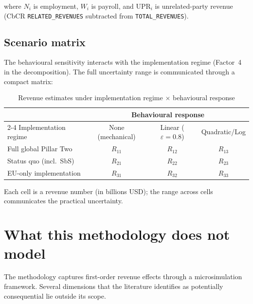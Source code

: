 \documentclass[11pt,a4paper]{article}
\newcommand{\code}[1]{\texttt{#1}}
\begin{document}
where $N_i$ is employment, $W_i$ is payroll, and $\text{UPR}_i$ is unrelated-party revenue (CbCR \code{RELATED\_REVENUES} subtracted from \code{TOTAL\_REVENUES}).

\subsection{Scenario matrix}\label{sec:scenario_matrix}

The behavioural sensitivity interacts with the implementation regime (Factor~4 in the decomposition). The full uncertainty range is communicated through a compact matrix:

\begin{table}[H]
\centering
\caption{Revenue estimates under implementation regime $\times$ behavioural response}
\label{tab:scenario_matrix}
\small
\begin{tabular}{@{}lccc@{}}
\toprule
& \multicolumn{3}{c}{Behavioural response} \\
\cmidrule(l){2-4}
Implementation regime & None (mechanical) & Linear ($\varepsilon = 0.8$) & Quadratic/Log \\
\midrule
Full global Pillar Two & $R_{11}$ & $R_{12}$ & $R_{13}$ \\
Status quo (incl.\ SbS) & $R_{21}$ & $R_{22}$ & $R_{23}$ \\
EU-only implementation & $R_{31}$ & $R_{32}$ & $R_{33}$ \\
\bottomrule
\end{tabular}
\end{table}

Each cell is a revenue number (in billions USD); the range across cells communicates the practical uncertainty.

\section{What this methodology does not model}\label{sec:limitations}

The methodology captures first-order revenue effects through a microsimulation framework. Several dimensions that the literature identifies as potentially consequential lie outside its scope.
\end{document}

